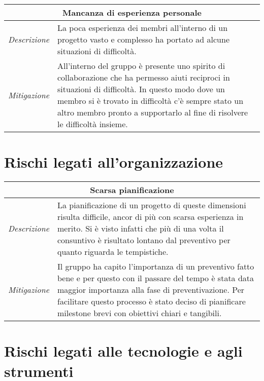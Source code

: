 \begin{table}[H]
    \centering
    \begin{tabular}{|p{2cm}|p{10cm}|}
    \hline
    \multicolumn{2}{|c|}{\textbf{Mancanza di esperienza personale}} \\ \hline
    \multicolumn{1}{|l|}{\textit{Descrizione}} & La poca esperienza dei membri all'interno di un progetto vasto e complesso ha portato ad alcune situazioni di difficoltà. \\ \hline
    \multicolumn{1}{|l|}{\textit{Mitigazione}} & All'interno del gruppo è presente uno spirito di collaborazione che ha permesso aiuti reciproci in situazioni di difficoltà. In questo modo dove un membro si è trovato in difficoltà c'è sempre stato un altro membro pronto a supportarlo al fine di risolvere le difficoltà insieme. \\ \hline
    \end{tabular}
\end{table}



\section{Rischi legati all'organizzazione}

\begin{table}[H]
    \centering
    \begin{tabular}{|p{2cm}|p{10cm}|}
    \hline
    \multicolumn{2}{|c|}{\textbf{Scarsa pianificazione}} \\ \hline
    \multicolumn{1}{|l|}{\textit{Descrizione}} & La pianificazione di un progetto di queste dimensioni risulta difficile, ancor di più con scarsa esperienza in merito. Si è visto infatti che più di una volta il consuntivo è risultato lontano dal preventivo per quanto riguarda le tempistiche. \\ \hline
    \multicolumn{1}{|l|}{\textit{Mitigazione}} & Il gruppo ha capito l'importanza di un preventivo fatto bene e per questo con il passare del tempo è stata data maggior importanza alla fase di preventivazione. Per facilitare questo processo è stato deciso di pianificare milestone brevi con obiettivi chiari e tangibili. \\ \hline
    \end{tabular}
\end{table}



\section{Rischi legati alle tecnologie e agli strumenti}

